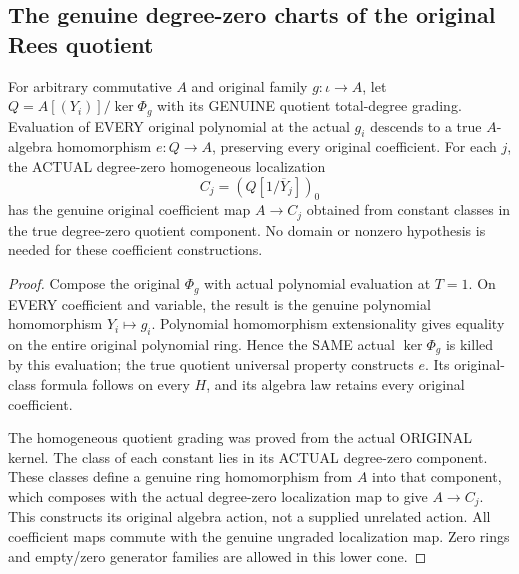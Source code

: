 \subsection{The genuine degree-zero charts of the original Rees quotient}

\begin{lemma}
\label{algebra:actual-rees-quotient-evaluation}
\leanok
For arbitrary commutative $A$ and original family $g:\iota\to A$, let
$Q=A[(Y_i)]/\ker\Phi_g$ with its GENUINE quotient total-degree grading.
Evaluation of EVERY original polynomial at the actual $g_i$ descends to a
true $A$-algebra homomorphism $e:Q\to A$, preserving every original coefficient.
For each $j$, the ACTUAL degree-zero homogeneous localization
\[
 C_j=(Q[1/\overline Y_j])_0
\]
has the genuine original coefficient map $A\to C_j$ obtained from constant
classes in the true degree-zero quotient component. No domain or nonzero
hypothesis is needed for these coefficient constructions.
\end{lemma}
\begin{proof}
Compose the original $\Phi_g$ with actual polynomial evaluation at $T=1$.
On EVERY coefficient and variable, the result is the genuine polynomial
homomorphism $Y_i\mapsto g_i$. Polynomial homomorphism extensionality gives
equality on the entire original polynomial ring. Hence the SAME actual
$\ker\Phi_g$ is killed by this evaluation; the true quotient universal
property constructs $e$. Its original-class formula follows on every $H$,
and its algebra law retains every original coefficient.

The homogeneous quotient grading was proved from the actual ORIGINAL kernel.
The class of each constant lies in its ACTUAL degree-zero component. These
classes define a genuine ring homomorphism from $A$ into that component,
which composes with the actual degree-zero localization map to give $A\to C_j$.
This constructs its original algebra action, not a supplied unrelated action.
All coefficient maps commute with the genuine ungraded localization map.
Zero rings and empty/zero generator families are allowed in this lower cone.
\end{proof}

